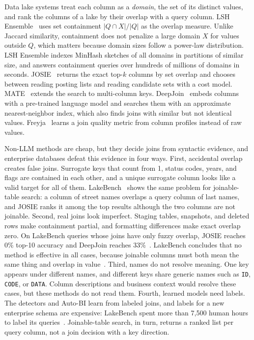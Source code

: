  Data lake systems treat each column as a \emph{domain}, the set of its distinct values, and rank the columns of a lake by their overlap with a query column.
LSH Ensemble~\cite{DBLP:journals/pvldb/ZhuNPM16} uses set containment $|Q \cap X| / |Q|$ as the overlap measure.
Unlike Jaccard similarity, containment does not penalize a large domain $X$ for values outside $Q$, which matters because domain sizes follow a power-law distribution.
LSH Ensemble indexes MinHash sketches of all domains in partitions of similar size, and answers containment queries over hundreds of millions of domains in seconds.
JOSIE~\cite{DBLP:conf/sigmod/ZhuDNM19} returns the exact top-$k$ columns by set overlap and chooses between reading posting lists and reading candidate sets with a cost model.
MATE~\cite{MATE} extends the search to multi-column keys.
DeepJoin~\cite{2023_dong_deepjoin} embeds columns with a pre-trained language model and searches them with an approximate nearest-neighbor index, which also finds joins with similar but not identical values.
Freyja~\cite{Freyja} learns a join quality metric from column profiles instead of raw values.

 Non-LLM methods are cheap, but they decide joins from syntactic evidence, and enterprise databases defeat this evidence in four ways.
First, accidental overlap creates false joins.
Surrogate keys that count from 1, status codes, years, and flags are contained in each other, and a unique surrogate column looks like a valid target for all of them.
LakeBench~\cite{LakeBench} shows the same problem for joinable-table search: a column of street names overlaps a query column of last names, and JOSIE ranks it among the top results although the two columns are not joinable.
Second, real joins look imperfect.
Staging tables, snapshots, and deleted rows make containment partial, and formatting differences make exact overlap zero.
On LakeBench queries whose joins have only fuzzy overlap, JOSIE reaches 0\% top-10 accuracy and DeepJoin reaches 33\%~\cite{LakeBench}.
LakeBench concludes that no method is effective in all cases, because joinable columns must both mean the same thing and overlap in value~\cite{LakeBench}.
Third, names do not resolve meaning.
One key appears under different names, and different keys share generic names such as \texttt{ID}, \texttt{CODE}, or \texttt{DATA}.
Column descriptions and business context would resolve these cases, but these methods do not read them.
Fourth, learned models need labels.
The detectors and Auto-BI learn from labeled joins, and labels for a new enterprise schema are expensive: LakeBench spent more than 7,500 human hours to label its queries~\cite{LakeBench}.
Joinable-table search, in turn, returns a ranked list per query column, not a join decision with a key direction.


